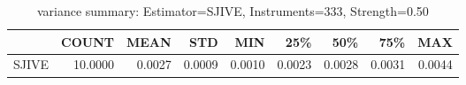 \begin{table}[ht]
\centering
\caption{variance summary: Estimator=SJIVE, Instruments=333, Strength=0.50}
\begin{tabular}{lrrrrrrrr}
\toprule
 & COUNT & MEAN & STD & MIN & 25\% & 50\% & 75\% & MAX \\
\midrule
SJIVE & 10.0000 & 0.0027 & 0.0009 & 0.0010 & 0.0023 & 0.0028 & 0.0031 & 0.0044 \\
\bottomrule
\end{tabular}
\end{table}
